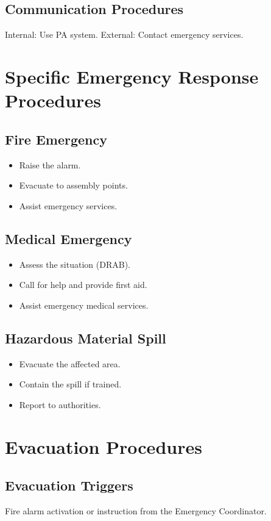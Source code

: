 \documentclass[11pt]{article}
\begin{document}
\subsection{Communication Procedures}
Internal: Use PA system. External: Contact emergency services.

\section{Specific Emergency Response Procedures}

\subsection{Fire Emergency}
\begin{itemize}
    \item Raise the alarm.
    \item Evacuate to assembly points.
    \item Assist emergency services.
\end{itemize}

\subsection{Medical Emergency}
\begin{itemize}
    \item Assess the situation (DRAB).
    \item Call for help and provide first aid.
    \item Assist emergency medical services.
\end{itemize}

\subsection{Hazardous Material Spill}
\begin{itemize}
    \item Evacuate the affected area.
    \item Contain the spill if trained.
    \item Report to authorities.
\end{itemize}

\section{Evacuation Procedures}

\subsection{Evacuation Triggers}
Fire alarm activation or instruction from the Emergency Coordinator.
\end{document}
